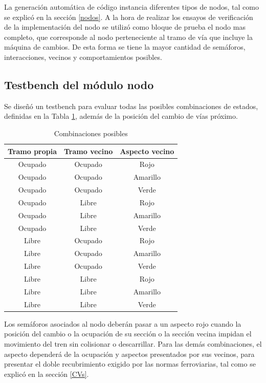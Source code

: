 	La generación automática de código instancia diferentes tipos de nodos, tal como se explicó en la sección \ref{nodos}. A la hora de realizar los ensayos de verificación de la implementación del nodo se utilizó como bloque de prueba el nodo mas completo, que corresponde al nodo perteneciente al tramo de vía que incluye la máquina de cambios. De esta forma se tiene la mayor cantidad de semáforos, interacciones, vecinos y comportamientos posibles.
	
	\subsection{Testbench del módulo nodo}
			
			Se diseñó un testbench para evaluar todas las posibles combinaciones de estados, definidas en la Tabla \ref{tabla_nodos}, además de la posición del cambio de vías próximo.
					
			\begin{table}[!hbt]
			\renewcommand{\arraystretch}{1.3}
			\caption{Combinaciones posibles}
			\label{tabla_nodos}
			\centering
			\begin{tabular}{ c  c  c }
			\hline
			Tramo propia & Tramo vecino & Aspecto vecino \\	
			\hline
			Ocupado & Ocupado & Rojo  \\
			Ocupado & Ocupado & Amarillo  \\
			Ocupado & Ocupado & Verde  \\	
			Ocupado & Libre & Rojo  \\
			Ocupado & Libre & Amarillo  \\
			Ocupado & Libre & Verde  \\	
			Libre & Ocupado & Rojo  \\
			Libre & Ocupado & Amarillo  \\
			Libre & Ocupado & Verde  \\	
			Libre & Libre & Rojo  \\
			Libre & Libre & Amarillo  \\
			Libre & Libre & Verde  \\	
			\end{tabular}
			\end{table}	
	
		Los semáforos asociados al nodo deberán pasar a un aspecto rojo cuando la posición del cambio o la ocupación de su sección o la sección vecina impidan el movimiento del tren sin colisionar o descarrillar. Para las demás combinaciones, el aspecto dependerá de la ocupación y aspectos presentados por sus vecinos, para presentar el doble recubrimiento exigido por las normas ferroviarias, tal como se explicó en la sección \ref{CVs}.
			
